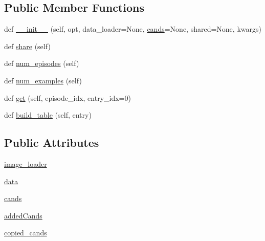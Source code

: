 \subsection*{Public Member Functions}
\begin{DoxyCompactItemize}
\item 
def \hyperlink{classparlai_1_1core_1_1teachers_1_1DialogData_a8c20c97b259bf583c53f47d235790813}{\+\_\+\+\_\+init\+\_\+\+\_\+} (self, opt, data\+\_\+loader=None, \hyperlink{classparlai_1_1core_1_1teachers_1_1DialogData_a21822d2d86e26a27bdc8326b48ebc9b9}{cands}=None, shared=None, kwargs)
\item 
def \hyperlink{classparlai_1_1core_1_1teachers_1_1DialogData_ada6f4dc4e2a8a84fba5f1e54d214d15e}{share} (self)
\item 
def \hyperlink{classparlai_1_1core_1_1teachers_1_1DialogData_a83e3457f29a54ec455ad76f7eab6cfc4}{num\+\_\+episodes} (self)
\item 
def \hyperlink{classparlai_1_1core_1_1teachers_1_1DialogData_a8deee9e9e45ae8162270bdcdfd7916b6}{num\+\_\+examples} (self)
\item 
def \hyperlink{classparlai_1_1core_1_1teachers_1_1DialogData_a1e037df2f18a67503db657ae4cc27ab4}{get} (self, episode\+\_\+idx, entry\+\_\+idx=0)
\item 
def \hyperlink{classparlai_1_1core_1_1teachers_1_1DialogData_a467bf261c35da2f5d2a34949281d2669}{build\+\_\+table} (self, entry)
\end{DoxyCompactItemize}
\subsection*{Public Attributes}
\begin{DoxyCompactItemize}
\item 
\hyperlink{classparlai_1_1core_1_1teachers_1_1DialogData_aa44f9307c376a1e4bf4697a289db688b}{image\+\_\+loader}
\item 
\hyperlink{classparlai_1_1core_1_1teachers_1_1DialogData_a4acc939bddc7bf81f0e19ae9fa9f197a}{data}
\item 
\hyperlink{classparlai_1_1core_1_1teachers_1_1DialogData_a21822d2d86e26a27bdc8326b48ebc9b9}{cands}
\item 
\hyperlink{classparlai_1_1core_1_1teachers_1_1DialogData_aee61e6bc9e80fe0443a7f5322c4ae08d}{added\+Cands}
\item 
\hyperlink{classparlai_1_1core_1_1teachers_1_1DialogData_a25f9100e2b36edf74528a60533e728e4}{copied\+\_\+cands}
\end{DoxyCompactItemize}
